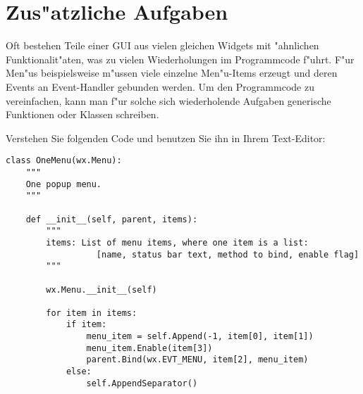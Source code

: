 \section*{Zus"atzliche Aufgaben}

\begin{aufgabe}[Refactoring]
Oft bestehen Teile einer GUI aus vielen gleichen Widgets mit "ahnlichen Funktionalit"aten, was zu vielen Wiederholungen im Programmcode f"uhrt. F"ur Men"us beispielsweise m"ussen viele einzelne Men"u-Items erzeugt und deren Events an Event-Handler gebunden werden. Um den Programmcode zu vereinfachen, kann man f"ur solche sich wiederholende Aufgaben generische Funktionen oder Klassen schreiben.

Verstehen Sie folgenden Code und benutzen Sie ihn in Ihrem Text-Editor:
\begin{lstlisting}
class OneMenu(wx.Menu):
    """
    One popup menu.
    """

    def __init__(self, parent, items):
        """
        items: List of menu items, where one item is a list:
                  [name, status bar text, method to bind, enable flag]
        """ 

        wx.Menu.__init__(self)
 
        for item in items:
            if item:
                menu_item = self.Append(-1, item[0], item[1])
                menu_item.Enable(item[3])
                parent.Bind(wx.EVT_MENU, item[2], menu_item)
            else:
                self.AppendSeparator()
\end{lstlisting}

\end{aufgabe}
